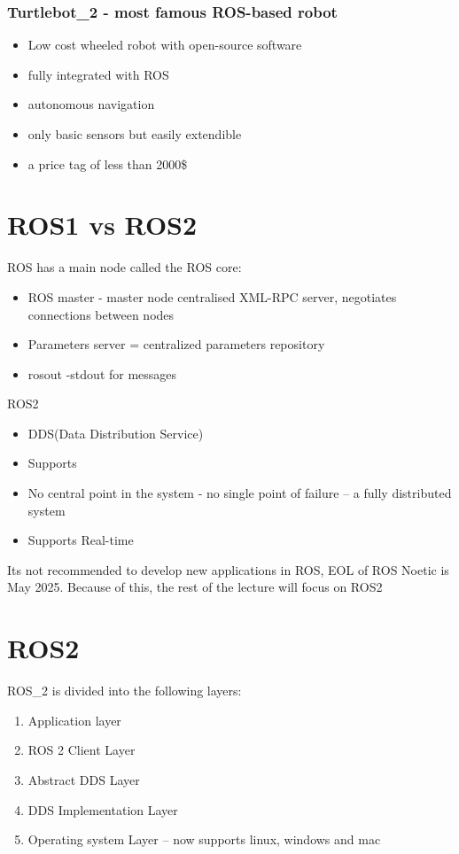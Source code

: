 \subsubsection{Turtlebot_2 - most famous ROS-based robot}
\begin{itemize}
        \item Low cost wheeled robot with open-source software
        \item fully integrated with ROS
        \item autonomous navigation
        \item only basic sensors but easily extendible
        \item a price tag of less than 2000\$
        
\end{itemize}
\section{ROS1 vs ROS2}
ROS has a main node called the ROS core:
\begin{itemize}
        \item ROS master - master node centralised XML-RPC server, negotiates connections between nodes
        \item Parameters server = centralized parameters repository
        \item rosout -stdout for messages
\end{itemize}
ROS2
\begin{itemize}
        \item DDS(Data Distribution Service)
        \item Supports
        \item No central point in the system - no single point of failure -- a fully distributed system
        \item Supports Real-time
\end{itemize}

\nt
{
    Its not recommended to develop new applications in ROS, EOL of ROS Noetic is May 2025. Because of this, the rest of the lecture will focus on ROS2
}

\section{ROS2}
ROS_2 is divided into the following layers:
\begin{enumerate}
    \item Application layer
    \item ROS 2 Client Layer
    \item Abstract DDS Layer
    \item DDS Implementation Layer
    \item Operating system Layer -- now supports linux, windows and mac
\end{enumerate}
